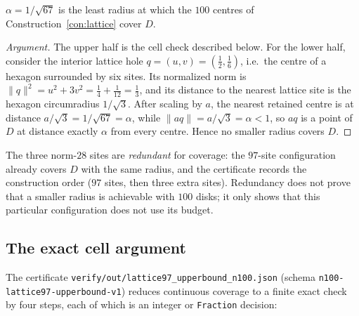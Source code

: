 \begin{proposition}\label{prop:lattice-alpha}
$\alpha=1/\sqrt{67}$ is the least radius at which the $100$ centres of Construction~\ref{con:lattice}
cover $D$.
\end{proposition}

\begin{proof}[Argument]
The upper half is the cell check described below. For the lower half, consider the interior lattice
hole $q=(u,v)=(\tfrac12,\tfrac16)$, i.e.\ the centre of a hexagon surrounded by six sites. Its
normalized norm is $\|q\|^2=u^2+3v^2=\tfrac14+\tfrac1{12}=\tfrac13$, and its distance to the nearest
lattice site is the hexagon circumradius $1/\sqrt3$. After scaling by $a$, the nearest retained
centre is at distance $a/\sqrt3=1/\sqrt{67}=\alpha$, while $\|a q\|=a/\sqrt3=\alpha<1$, so $aq$ is a
point of $D$ at distance exactly $\alpha$ from every centre. Hence no smaller radius covers $D$.
\end{proof}

\begin{remark}
The three norm-$28$ sites are \emph{redundant} for coverage: the $97$-site configuration already
covers $D$ with the same radius, and the certificate records the construction order
($97$ sites, then three extra sites). Redundancy does not prove that a smaller radius is achievable
with $100$ disks; it only shows that this particular configuration does not use its budget.
\end{remark}

\subsection{The exact cell argument}

The certificate \texttt{verify/\allowbreak{}out/\allowbreak{}lattice97\_\allowbreak{}upperbound\_\allowbreak{}n100.json} (schema
\texttt{n100-\allowbreak{}lattice97-\allowbreak{}upperbound-\allowbreak{}v1}) reduces continuous coverage to a finite exact check by four
steps, each of which is an integer or \texttt{Fraction} decision:

